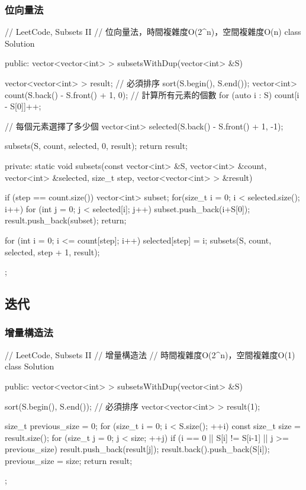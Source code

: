 \subsubsection{位向量法}
\begin{Code}
// LeetCode, Subsets II
// 位向量法，時間複雜度O(2^n)，空間複雜度O(n)
class Solution {
public:
    vector<vector<int> > subsetsWithDup(vector<int> &S) {
        vector<vector<int> > result; // 必須排序
        sort(S.begin(), S.end());
        vector<int> count(S.back() - S.front() + 1, 0);
        // 計算所有元素的個數
        for (auto i : S) {
            count[i - S[0]]++;
        }

        // 每個元素選擇了多少個
        vector<int> selected(S.back() - S.front() + 1, -1);

        subsets(S, count, selected, 0, result);
        return result;
    }

private:
    static void subsets(const vector<int> &S, vector<int> &count,
            vector<int> &selected, size_t step, vector<vector<int> > &result) {
        if (step == count.size()) {
            vector<int> subset;
            for(size_t i = 0; i < selected.size(); i++) {
                for (int j = 0; j < selected[i]; j++) {
                    subset.push_back(i+S[0]);
                }
            }
            result.push_back(subset);
            return;
        }

        for (int i = 0; i <= count[step]; i++) {
            selected[step] = i;
            subsets(S, count, selected, step + 1, result);
        }
    }
};
\end{Code}


\subsection{迭代}


\subsubsection{增量構造法}
\begin{Code}
// LeetCode, Subsets II
// 增量構造法
// 時間複雜度O(2^n)，空間複雜度O(1)
class Solution {
public:
    vector<vector<int> > subsetsWithDup(vector<int> &S) {
        sort(S.begin(), S.end()); // 必須排序
        vector<vector<int> > result(1);

        size_t previous_size = 0;
        for (size_t i = 0; i < S.size(); ++i) {
            const size_t size = result.size();
            for (size_t j = 0; j < size; ++j) {
                if (i == 0 || S[i] != S[i-1] || j >= previous_size) {
                    result.push_back(result[j]);
                    result.back().push_back(S[i]);
                }
            }
            previous_size = size;
        }
        return result;
    }
};
\end{Code}


